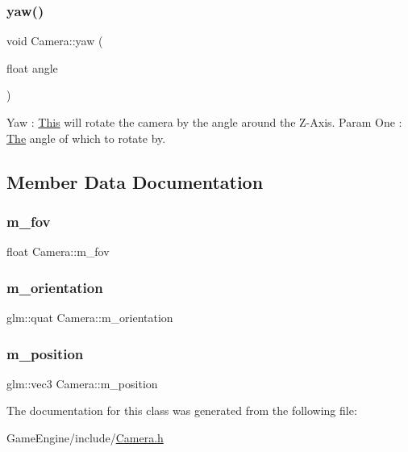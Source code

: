 \subsubsection{\texorpdfstring{yaw()}{yaw()}}
{\footnotesize\ttfamily void Camera\+::yaw (\begin{DoxyParamCaption}\item[{float}]{angle }\end{DoxyParamCaption})\hspace{0.3cm}{\ttfamily [inline]}}

Yaw \+: \mbox{\hyperlink{class_this}{This}} will rotate the camera by the angle around the Z-\/\+Axis. Param One \+: \mbox{\hyperlink{class_the}{The}} angle of which to rotate by. 

\subsection{Member Data Documentation}
\mbox{\label{class_camera_aa404a4e057fa16fb82ce8668d7a661b6}} 
\subsubsection{\texorpdfstring{m\+\_\+fov}{m\_fov}}
{\footnotesize\ttfamily float Camera\+::m\+\_\+fov}

\mbox{\label{class_camera_ac035d6cb4b4bae255d6d12f51137357e}} 
\subsubsection{\texorpdfstring{m\+\_\+orientation}{m\_orientation}}
{\footnotesize\ttfamily glm\+::quat Camera\+::m\+\_\+orientation}

\mbox{\label{class_camera_aa4d06d49524248f81823444fa2544da0}} 
\subsubsection{\texorpdfstring{m\+\_\+position}{m\_position}}
{\footnotesize\ttfamily glm\+::vec3 Camera\+::m\+\_\+position}



The documentation for this class was generated from the following file\+:\begin{DoxyCompactItemize}
\item 
Game\+Engine/include/\mbox{\hyperlink{_camera_8h}{Camera.\+h}}\end{DoxyCompactItemize}

